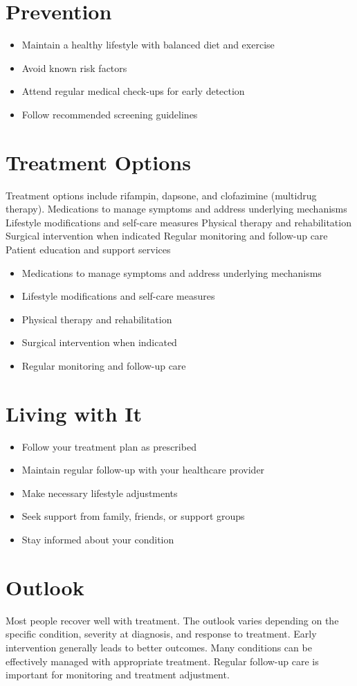 \section{Prevention}
\begin{itemize}[noitemsep]
  \item Maintain a healthy lifestyle with balanced diet and exercise
  \item Avoid known risk factors
  \item Attend regular medical check-ups for early detection
  \item Follow recommended screening guidelines
\end{itemize}
\section{Treatment Options}
Treatment options include rifampin, dapsone, and clofazimine (multidrug therapy). Medications to manage symptoms and address underlying mechanisms Lifestyle modifications and self-care measures Physical therapy and rehabilitation Surgical intervention when indicated Regular monitoring and follow-up care Patient education and support services

\begin{itemize}[noitemsep]
  \item Medications to manage symptoms and address underlying mechanisms
  \item Lifestyle modifications and self-care measures
  \item Physical therapy and rehabilitation
  \item Surgical intervention when indicated
  \item Regular monitoring and follow-up care
\end{itemize}
\section{Living with It}
\begin{itemize}[noitemsep]
  \item Follow your treatment plan as prescribed
  \item Maintain regular follow-up with your healthcare provider
  \item Make necessary lifestyle adjustments
  \item Seek support from family, friends, or support groups
  \item Stay informed about your condition
\end{itemize}
\section{Outlook}
Most people recover well with treatment. The outlook varies depending on the specific condition, severity at diagnosis, and response to treatment. Early intervention generally leads to better outcomes. Many conditions can be effectively managed with appropriate treatment. Regular follow-up care is important for monitoring and treatment adjustment.
